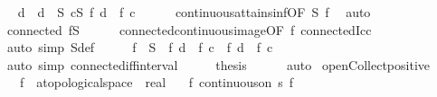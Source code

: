 \begin{isabellebody}
\ \isamarkupfalse%
\ d\ \ {\isachardoublequoteopen}d\ {\isasymin}\ S{\isachardoublequoteclose}\ {\isachardoublequoteopen}{\isasymforall}c{\isasymin}S{\isachardot}{\kern0pt}\ f\ d\ {\isasymle}\ f\ c{\isachardoublequoteclose}\isanewline
\ \ \ \ \isamarkupfalse%
\ continuous{\isacharunderscore}{\kern0pt}attains{\isacharunderscore}{\kern0pt}inf{\isacharbrackleft}{\kern0pt}OF\ S\ f{\isacharbrackright}{\kern0pt}\ \isamarkupfalse%
\ auto\isanewline
\ \ \isamarkupfalse%
\ \isamarkupfalse%
\ {\isachardoublequoteopen}connected\ {\isacharparenleft}{\kern0pt}f{\isacharbackquote}{\kern0pt}S{\isacharparenright}{\kern0pt}{\isachardoublequoteclose}\isanewline
\ \ \ \ \isamarkupfalse%
\ connected{\isacharunderscore}{\kern0pt}continuous{\isacharunderscore}{\kern0pt}image{\isacharbrackleft}{\kern0pt}OF\ f{\isacharbrackright}{\kern0pt}\ connected{\isacharunderscore}{\kern0pt}Icc\ \isamarkupfalse%
\ {\isacharparenleft}{\kern0pt}auto\ simp{\isacharcolon}{\kern0pt}\ S{\isacharunderscore}{\kern0pt}def{\isacharparenright}{\kern0pt}\isanewline
\ \ \isamarkupfalse%
\ \isamarkupfalse%
\ {\isachardoublequoteopen}f\ {\isacharbackquote}{\kern0pt}\ S\ {\isacharequal}{\kern0pt}\ {\isacharbraceleft}{\kern0pt}f\ d\ {\isachardot}{\kern0pt}{\isachardot}{\kern0pt}\ f\ c{\isacharbraceright}{\kern0pt}\ {\isasymand}\ f\ d\ {\isasymle}\ f\ c{\isachardoublequoteclose}\isanewline
\ \ \ \ \isamarkupfalse%
\ {\isacharparenleft}{\kern0pt}auto\ simp{\isacharcolon}{\kern0pt}\ connected{\isacharunderscore}{\kern0pt}iff{\isacharunderscore}{\kern0pt}interval{\isacharparenright}{\kern0pt}\isanewline
\ \ \isamarkupfalse%
\ \isamarkupfalse%
\ {\isacharquery}{\kern0pt}thesis\isanewline
\ \ \ \ \isamarkupfalse%
\ auto\isanewline
{}\isamarkupfalse%
%
\endisatagproof
{\isafoldproof}%
%
\isadelimproof
\isanewline
%
\endisadelimproof
\isanewline
{}\isamarkupfalse%
\ open{\isacharunderscore}{\kern0pt}Collect{\isacharunderscore}{\kern0pt}positive{\isacharcolon}{\kern0pt}\isanewline
\ \ \ f\ {\isacharcolon}{\kern0pt}{\isacharcolon}{\kern0pt}\ {\isachardoublequoteopen}{\isacharprime}{\kern0pt}a{\isacharcolon}{\kern0pt}{\isacharcolon}{\kern0pt}topological{\isacharunderscore}{\kern0pt}space\ {\isasymRightarrow}\ real{\isachardoublequoteclose}\isanewline
\ \ \ f{\isacharcolon}{\kern0pt}\ {\isachardoublequoteopen}continuous{\isacharunderscore}{\kern0pt}on\ s\ f{\isachardoublequoteclose}\isanewline

\end{isabellebody}
